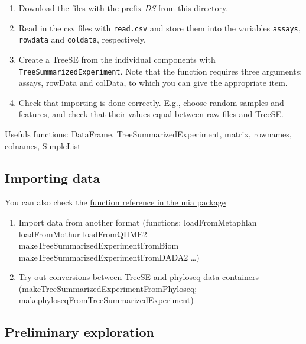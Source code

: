 \documentclass[
]{book}
\providecommand{\tightlist}{%
  \setlength{\itemsep}{0pt}\setlength{\parskip}{0pt}}
\begin{document}
\begin{enumerate}
\def\labelenumi{\arabic{enumi}.}
\tightlist
\item
  Download the files with the prefix \emph{DS} from
  \href{https://github.com/JuliaTurkuDataScience/MicrobiomeAnalysis.jl/tree/main/src/assets}{this directory}.
\item
  Read in the csv files with \texttt{read.csv} and store them into the variables
  \texttt{assays}, \texttt{rowdata} and \texttt{coldata}, respectively.
\item
  Create a TreeSE from the individual components with \texttt{TreeSummarizedExperiment}.
  Note that the function requires three arguments: assays, rowData and colData,
  to which you can give the appropriate item.
\item
  Check that importing is done correctly. E.g., choose random samples and features,
  and check that their values equal between raw files and TreeSE.
\end{enumerate}

Usefuls functions: DataFrame, TreeSummarizedExperiment, matrix, rownames, colnames, SimpleList

\hypertarget{importing-data}{%
\subsection{Importing data}\label{importing-data}}

You can also check the \href{https://microbiome.github.io/mia/reference/index.html}{function reference in the mia package}

\begin{enumerate}
\def\labelenumi{\arabic{enumi}.}
\tightlist
\item
  Import data from another format (functions: loadFromMetaphlan \textbar{} loadFromMothur \textbar{} loadFromQIIME2 \textbar{} makeTreeSummarizedExperimentFromBiom \textbar{} makeTreeSummarizedExperimentFromDADA2 \ldots)
\item
  Try out conversions between TreeSE and phyloseq data containers (makeTreeSummarizedExperimentFromPhyloseq; makephyloseqFromTreeSummarizedExperiment)
\end{enumerate}

\hypertarget{preliminary-exploration}{%
\subsection{Preliminary exploration}\label{preliminary-exploration}}
\end{document}
